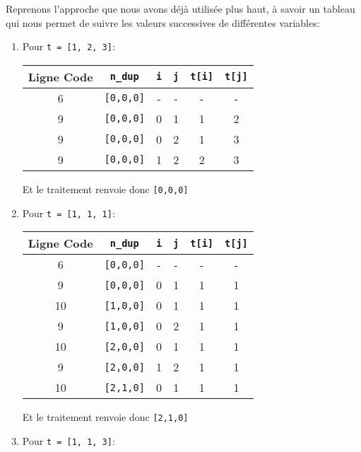 \documentclass[12pt]{article}
\begin{document}
	\begin{MaReponse}
		\begin{alphenum}
			\item Reprenons l'approche que nous avons déjà utilisée plus haut, à savoir un tableau qui nous permet de suivre les valeurs successives de différentes variables:
			\begin{enumerate}
				\item Pour \texttt{t = [1, 2, 3]}:
				
				\begin{tabular}{|c|c|c|c|c|c|}
					\hline
					\textbf{Ligne Code} & \texttt{n\_dup} & \texttt{i} & \texttt{j} & \texttt{t[i]} & \texttt{t[j]} \\
					\hline
					6 & \texttt{[0,0,0]} & - & - & - & -\\
					\hline 
					9 & \texttt{[0,0,0]} & 0 & 1 & 1 & 2\\
					\hline 
					9 & \texttt{[0,0,0]} & 0 & 2 & 1 & 3\\
					\hline 
					9 & \texttt{[0,0,0]} & 1 & 2 & 2 & 3\\
					\hline 
				\end{tabular}
				
				Et le traitement renvoie donc \texttt{[0,0,0]}
				
				\item Pour \texttt{t = [1, 1, 1]}:
				
				\begin{tabular}{|c|c|c|c|c|c|}
					\hline
					\textbf{Ligne Code} & \texttt{n\_dup} & \texttt{i} & \texttt{j} & \texttt{t[i]} & \texttt{t[j]} \\
					\hline
					6 & \texttt{[0,0,0]} & - & - & - & -\\
					\hline 
					9 & \texttt{[0,0,0]} & 0 & 1 & 1 & 1\\
					\hline 
					10 & \texttt{[1,0,0]} & 0 & 1 & 1 & 1\\
					\hline 
					9 & \texttt{[1,0,0]} & 0 & 2 & 1 & 1\\
					\hline 
					10 & \texttt{[2,0,0]} & 0 & 1 & 1 & 1\\
					\hline 
					9 & \texttt{[2,0,0]} & 1 & 2 & 1 & 1\\
					\hline 
					10 & \texttt{[2,1,0]} & 0 & 1 & 1 & 1\\
					\hline 
				\end{tabular}
				
				Et le traitement renvoie donc \texttt{[2,1,0]}
				
				\item Pour \texttt{t = [1, 1, 3]}:
				

\end{enumerate}
\end{alphenum}
\end{MaReponse}
\end{document}
